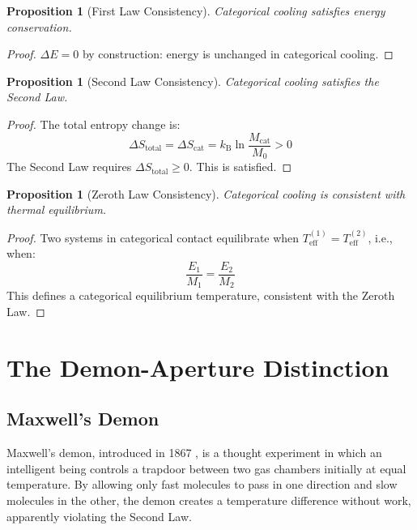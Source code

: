 \documentclass[twocolumn,10pt,twoside]{article}
\newtheorem{proposition}[theorem]{Proposition}
\newcommand{\kb}{k_{\mathrm{B}}}
\newcommand{\Teff}{T_{\mathrm{eff}}}
\newcommand{\Mcat}{M_{\mathrm{cat}}}
\newcommand{\Scat}{S_{\mathrm{cat}}}
\begin{document}
\begin{proposition}[First Law Consistency]
Categorical cooling satisfies energy conservation.
\end{proposition}

\begin{proof}
$\Delta E = 0$ by construction: energy is unchanged in categorical cooling.
\end{proof}

\begin{proposition}[Second Law Consistency]
Categorical cooling satisfies the Second Law.
\end{proposition}

\begin{proof}
The total entropy change is:
\begin{equation}
\Delta S_{\text{total}} = \Delta \Scat = \kb \ln \frac{\Mcat}{M_0} > 0
\end{equation}
The Second Law requires $\Delta S_{\text{total}} \geq 0$. This is satisfied.
\end{proof}

\begin{proposition}[Zeroth Law Consistency]
Categorical cooling is consistent with thermal equilibrium.
\end{proposition}

\begin{proof}
Two systems in categorical contact equilibrate when $\Teff^{(1)} = \Teff^{(2)}$, i.e., when:
\begin{equation}
\frac{E_1}{M_1} = \frac{E_2}{M_2}
\end{equation}
This defines a categorical equilibrium temperature, consistent with the Zeroth Law.
\end{proof}

\section{The Demon-Aperture Distinction}

\subsection{Maxwell's Demon}

Maxwell's demon, introduced in 1867 \cite{maxwell1867}, is a thought experiment in which an intelligent being controls a trapdoor between two gas chambers initially at equal temperature. By allowing only fast molecules to pass in one direction and slow molecules in the other, the demon creates a temperature difference without work, apparently violating the Second Law.
\end{document}

